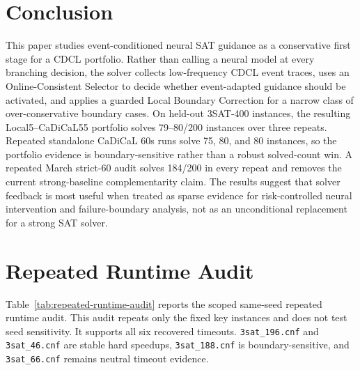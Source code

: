 \documentclass[11pt]{article}
\begin{document}
\section{Conclusion}

This paper studies event-conditioned neural SAT guidance as a conservative first stage for a CDCL portfolio. Rather than calling a neural model at every branching decision, the solver collects low-frequency CDCL event traces, uses an Online-Consistent Selector to decide whether event-adapted guidance should be activated, and applies a guarded Local Boundary Correction for a narrow class of over-conservative boundary cases. On held-out 3SAT-400 instances, the resulting Local5--CaDiCaL55 portfolio solves 79--80/200 instances over three repeats. Repeated standalone CaDiCaL 60s runs solve 75, 80, and 80 instances, so the portfolio evidence is boundary-sensitive rather than a robust solved-count win. A repeated March strict-60 audit solves 184/200 in every repeat and removes the current strong-baseline complementarity claim. The results suggest that solver feedback is most useful when treated as sparse evidence for risk-controlled neural intervention and failure-boundary analysis, not as an unconditional replacement for a strong SAT solver.

\clearpage
\appendix

\section{Repeated Runtime Audit}

Table~\ref{tab:repeated-runtime-audit} reports the scoped same-seed repeated runtime audit. This audit repeats only the fixed key instances and does not test seed sensitivity. It supports all six recovered timeouts. \texttt{3sat\_196.cnf} and \texttt{3sat\_46.cnf} are stable hard speedups, \texttt{3sat\_188.cnf} is boundary-sensitive, and \texttt{3sat\_66.cnf} remains neutral timeout evidence.
\end{document}
